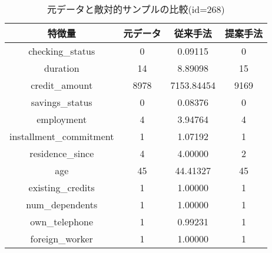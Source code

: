 \begin{table}[H]
    \centering
    \caption{元データと敵対的サンプルの比較(id=268)}
    \begin{tabular}{|c|c|c|c|} \hline
        特徴量 & 元データ & 従来手法 & 提案手法 \\ \hline
        checking\_status & 0 & 0.09115 & 0 \\ \hline
        duration & 14 & 8.89098 & 15 \\ \hline
        credit\_amount & 8978 & 7153.84454 & 9169 \\ \hline
        savings\_status & 0 & 0.08376 & 0 \\ \hline
        employment & 4 & 3.94764 & 4 \\ \hline
        installment\_commitment & 1 & 1.07192 & 1 \\ \hline
        residence\_since & 4 & 4.00000 & 2 \\ \hline
        age & 45 & 44.41327 & 45 \\ \hline
        existing\_credits & 1 & 1.00000 & 1 \\ \hline
        num\_dependents & 1 & 1.00000 & 1 \\ \hline
        own\_telephone & 1 & 0.99231 & 1 \\ \hline
        foreign\_worker & 1 & 1.00000 & 1 \\ \hline
    \end{tabular}
\end{table}


% 
% 

